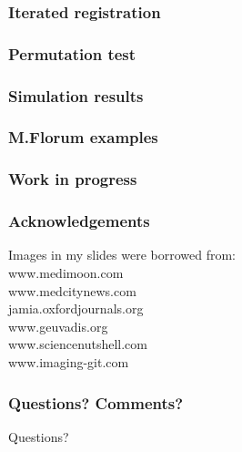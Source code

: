 \documentclass[10pt,dvipsnames,table, notes]{beamer}
\begin{document}
\begin{frame}
\frametitle{Iterated registration}

\end{frame}

\begin{frame}
\frametitle{Permutation test}

\end{frame}

\begin{frame}
\frametitle{Simulation results}

\end{frame}

\begin{frame}
\frametitle{M.Florum examples}

\end{frame}

\begin{frame}
\frametitle{Work in progress}

\end{frame}

\begin{frame}
\frametitle{Acknowledgements}
Images in my slides were borrowed from: \\
www.medimoon.com \\
www.medcitynews.com \\
jamia.oxfordjournals.org \\
www.geuvadis.org \\
www.sciencenutshell.com \\
www.imaging-git.com \\

\end{frame}

\begin{frame}
\frametitle{Questions? Comments?}
Questions?
\end{frame}
\end{document}
